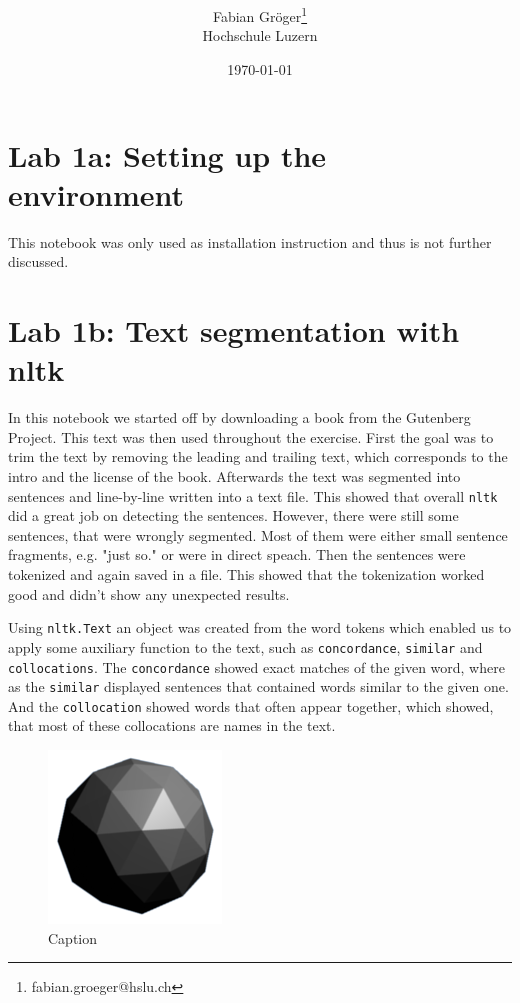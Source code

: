 \documentclass[onecolumn]{article}
\title{\spacecaps{Lab report: SW01 }\\ \normalsize \spacesc{TSM\_AnTeDe} }
\author{Fabian Gröger\thanks{fabian.groeger@hslu.ch}\\Hochschule Luzern}
\date{\today}
\begin{document}
\maketitle

\section{Lab 1a: Setting up the environment}
This notebook was only used as installation instruction and thus is not further discussed.

\section{Lab 1b: Text segmentation with nltk}
In this notebook we started off by downloading a book from the Gutenberg Project. This text was then used throughout the exercise. First the goal was to trim the text by removing the leading and trailing text, which corresponds to the intro and the license of the book. Afterwards the text was segmented into sentences and line-by-line written into a text file. This showed that overall \verb|nltk| did a great job on detecting the sentences. However, there were still some sentences, that were wrongly segmented. Most of them were either small sentence fragments, e.g. "just so." or were in direct speach. Then the sentences were tokenized and again saved in a file. This showed that the tokenization worked good and didn't show any unexpected results.

Using \verb|nltk.Text| an object was created from the word tokens which enabled us to apply some auxiliary function to the text, such as \verb|concordance|, \verb|similar| and \verb|collocations|. The \verb|concordance| showed exact matches of the given word, where as the \verb|similar| displayed sentences that contained words similar to the given one. And the \verb|collocation| showed words that often appear together, which showed, that most of these collocations are names in the text.

\begin{figure}[t]
\centering
    \includegraphics[width=.3\linewidth]{fig/flat.png}
\caption{\label{fig:demo-bad}
Caption}
\end{figure}
\end{document}
